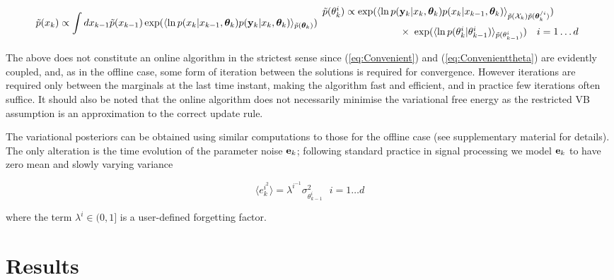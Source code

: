 \documentclass[12pt]{article}
\begin{document}
\begin{subequations}

\begin{equation} \label{eq:Convenient} \pt(x_k) \propto\displaystyle\int{ dx_{k-1}}
	\pt(x_{k-1})\exp(\langle\ln p(x_k| x_{k-1},\thetab_k)p(\yk |
	x_k,\thetab_k)\rangle_{\pt(\thetab_k)}) \end{equation}

\begin{equation} \label{eq:Convenienttheta} \begin{array}{l} \pt(\theta^i_k)\propto\exp(\langle \ln
	p(\yk|x_k,\thetab_k) p(x_k|x_{k-1},\thetab_k)\rangle_{\pt(\Xk)\pt(\thetab_k^{/i})})  \\
	[2ex] ~~~~~~~~~~~~~~~~~~~~~~~~ \times~ \exp(\langle\ln
	p(\theta^i_k|\theta^i_{k-1})\rangle_{\pt(\theta^i_{k-1})}) ~~~ i = 1 \dots d
\end{array} \end{equation}


\end{subequations}


The above does not constitute an online algorithm in the strictest sense since (\ref{eq:Convenient})
and (\ref{eq:Convenienttheta}) are evidently coupled, and, as in the offline case, some form of
iteration between the solutions is required for convergence. However iterations are required only
between the marginals at the last time instant, making the algorithm fast and efficient, and in
practice few iterations often suffice. It should also be noted that the online algorithm does not
necessarily minimise the variational free energy as the restricted VB assumption is an approximation
to the correct update rule.

The variational posteriors can be obtained using similar computations to those for the offline case
(see supplementary material for details). The only alteration is the time evolution of the parameter
noise ${\bf e}_k$; following standard practice in signal processing \cite{Haykin_2001} we model ${\bf e}_k$ to
have zero mean and slowly varying variance

\begin{equation} \langle e^{i^2}_k \rangle = \lambda^{i^{-1}}\sigma^2_{\theta^{i}_{k-1}}  ~~~ i = 1 \dots d \end{equation}

\noindent where the term $\lambda^i \in (0,1]$ is a user-defined forgetting factor.

\section{Results}
\end{document}
